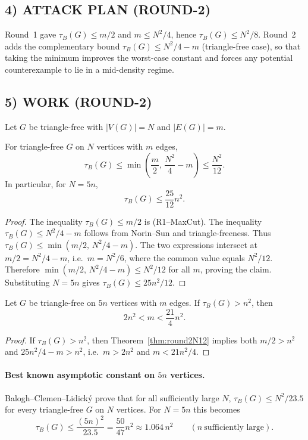 \subsection*{4) ATTACK PLAN (ROUND-2)}
Round~1 gave $\tau_B(G)\le m/2$ and $m\le N^2/4$, hence $\tau_B(G)\le N^2/8$.
Round~2 adds the complementary bound $\tau_B(G)\le N^2/4-m$ (triangle-free case),
so that taking the minimum improves the worst-case constant and forces any potential
counterexample to lie in a mid-density regime.

\subsection*{5) WORK (ROUND-2)}
Let $G$ be triangle-free with $|V(G)|=N$ and $|E(G)|=m$.

\begin{theorem}
\label{thm:round2N12}
For triangle-free $G$ on $N$ vertices with $m$ edges,
\[
\tau_B(G)\le \min\!\left(\frac{m}{2},\,\frac{N^2}{4}-m\right)\le \frac{N^2}{12}.
\]
In particular, for $N=5n$,
\[
\tau_B(G)\le \frac{25}{12}n^2.
\]
\end{theorem}

\begin{proof}
The inequality $\tau_B(G)\le m/2$ is (R1--MaxCut).
The inequality $\tau_B(G)\le N^2/4-m$ follows from Norin--Sun and triangle-freeness.
Thus $\tau_B(G)\le \min(m/2,\,N^2/4-m)$.
The two expressions intersect at $m/2=N^2/4-m$, i.e.\ $m=N^2/6$, where the common
value equals $N^2/12$.
Therefore $\min(m/2,\,N^2/4-m)\le N^2/12$ for all $m$, proving the claim.
Substituting $N=5n$ gives $\tau_B(G)\le 25n^2/12$.
\end{proof}

\begin{corollary}
\label{cor:round2density}
Let $G$ be triangle-free on $5n$ vertices with $m$ edges.
If $\tau_B(G)>n^2$, then
\[
2n^2<m<\frac{21}{4}n^2.
\]
\end{corollary}

\begin{proof}
If $\tau_B(G)>n^2$, then Theorem~\ref{thm:round2N12} implies both
$m/2>n^2$ and $25n^2/4-m>n^2$, i.e.\ $m>2n^2$ and $m<21n^2/4$.
\end{proof}

\paragraph{Best known asymptotic constant on $5n$ vertices.}
Balogh--Clemen--Lidick\'y prove that for all sufficiently large $N$,
$\tau_B(G)\le N^2/23.5$ for every triangle-free $G$ on $N$ vertices.
For $N=5n$ this becomes
\[
\tau_B(G)\le \frac{(5n)^2}{23.5}=\frac{50}{47}n^2\approx 1.064\,n^2
\qquad (n\ \text{sufficiently large}).
\]

